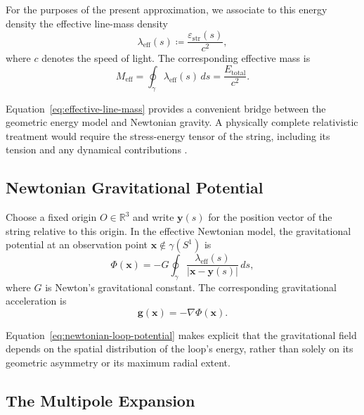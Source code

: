 \documentclass{article}
\numberwithin{tm}{section}
\numberwithin{dn}{section}
\numberwithin{as}{section}
\numberwithin{rk}{section}
\numberwithin{lem}{section}
\numberwithin{ax}{section}
\numberwithin{pp}{section}
\numberwithin{eg}{section}
\numberwithin{war}{section}
\numberwithin{equation}{section}
\numberwithin{prop}{section}
\numberwithin{nt}{section}
\numberwithin{rc}{section}
\begin{document}
For the purposes of the present approximation, we associate
to this energy density the effective line-mass density
\begin{equation}
	\label{eq:effective-line-mass}
	\lambda_{\mathrm{eff}}(s)
	\coloneq
	\frac{\varepsilon_{\mathrm{str}}(s)}{c^2},
\end{equation}
where $c$ denotes the speed of light. The corresponding
effective mass is
\begin{equation}
	\label{eq:effective-total-mass}
	M_{\mathrm{eff}}
	=
	\oint_\gamma \lambda_{\mathrm{eff}}(s)\,ds
	=
	\frac{E_{\mathrm{total}}}{c^2}.
\end{equation}

Equation~\eqref{eq:effective-line-mass} provides a convenient
bridge between the geometric energy model and Newtonian
gravity. A physically complete relativistic treatment would
require the stress-energy tensor of the string, including
its tension and any dynamical contributions
\cite{ChernoffFlanaganWardell2019StringBackreaction}.

\subsection{Newtonian Gravitational Potential}

Choose a fixed origin $O\in\mathbb{R}^3$ and write
$\mathbf{y}(s)$ for the position vector of the string relative
to this origin. In the effective Newtonian model, the
gravitational potential at an observation point
$\mathbf{x}\notin\gamma(S^1)$ is
\begin{equation}
	\label{eq:newtonian-loop-potential}
	\Phi(\mathbf{x})
	=
	-G\oint_\gamma
	\frac{\lambda_{\mathrm{eff}}(s)}
	{|\mathbf{x}-\mathbf{y}(s)|}\,ds,
\end{equation}
where $G$ is Newton's gravitational constant. The corresponding
gravitational acceleration is
\begin{equation}
	\mathbf{g}(\mathbf{x})=-\nabla\Phi(\mathbf{x}).
\end{equation}

Equation~\eqref{eq:newtonian-loop-potential} makes explicit
that the gravitational field depends on the spatial
distribution of the loop's energy, rather than solely on
its geometric asymmetry or its maximum radial extent.

\subsection{The Multipole Expansion}
\end{document}
